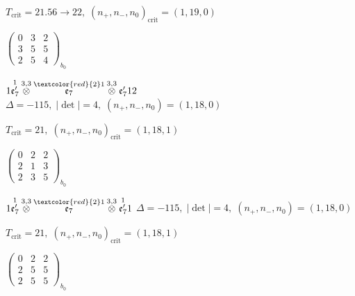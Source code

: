 \documentclass[10pt]{article}
\begin{document}
\hspace{1em}$T_{\text{crit}}=21.56 \to 22,\; (n_+,n_-,n_0)_{\text{crit}}=(1,19,0)$

\hspace{2em}$\left(\begin{smallmatrix}0 & 3 & 2 \\ 3 & 5 & 5 \\ 2 & 5 & 4\end{smallmatrix}\right)_{\!b_0}$

\smallskip

$1\overset{1}{\mathfrak{e}_7'}\overset{3,3}{\otimes}\overset{\textcolor{red}{2}1}{\mathfrak{e}_7}\overset{3,3}{\otimes}\mathfrak{e}_7'12$ \quad $\Delta=-115,\; |\det|=4,\; (n_+,n_-,n_0)=(1,18,0)$

\hspace{1em}$T_{\text{crit}}=21,\; (n_+,n_-,n_0)_{\text{crit}}=(1,18,1)$

\hspace{2em}$\left(\begin{smallmatrix}0 & 2 & 2 \\ 2 & 1 & 3 \\ 2 & 3 & 5\end{smallmatrix}\right)_{\!b_0}$

\smallskip

$1\overset{1}{\mathfrak{e}_7'}\overset{3,3}{\otimes}\overset{\textcolor{red}{2}1}{\mathfrak{e}_7}\overset{3,3}{\otimes}\overset{1}{\mathfrak{e}_7'}1$ \quad $\Delta=-115,\; |\det|=4,\; (n_+,n_-,n_0)=(1,18,0)$

\hspace{1em}$T_{\text{crit}}=21,\; (n_+,n_-,n_0)_{\text{crit}}=(1,18,1)$

\hspace{2em}$\left(\begin{smallmatrix}0 & 2 & 2 \\ 2 & 5 & 5 \\ 2 & 5 & 5\end{smallmatrix}\right)_{\!b_0}$

\smallskip
\end{document}
